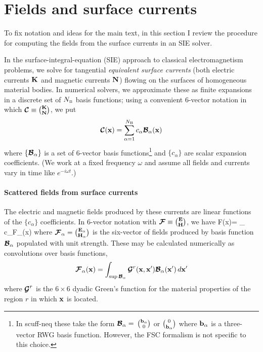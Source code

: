 \newpage
\section{Fields and surface currents}

To fix notation and ideas for the main text, in this section
I review the procedure for computing the fields from the 
surface currents in an SIE solver.

In the surface-integral-equation (SIE) approach to
classical electromagnetism problems, we solve for tangential
\textit{equivalent surface currents} (both electric currents $\mathbf{K}$ 
and magnetic currents $\mathbf{N}$) flowing on the surfaces of 
homogeneous material bodies. In numerical solvers, we 
approximate these as finite expansions in a discrete set
of $N_{\hbox{\tiny{B}}}$ basis functions; using a convenient 6-vector notation 
in which $\boldsymbol{\mathcal{C}}\equiv {\mathbf{K} \choose \mathbf{N}}$, we put
$$ \boldsymbol{\mathcal{C}}(\mathbf{x})=\sum_{\alpha=1}^{N_{\hbox{\tiny{B}}}} 
   c_\alpha \boldsymbol{\mathcal{B}}_\alpha(\mathbf{x}) 
$$ 
where $\{\boldsymbol{\mathcal{B}}_\alpha\}$ is a set of 6-vector basis 
functions\footnote{In {\sc scuff-neq} these take the form
$\boldsymbol{\mathcal{B}}_\alpha=$ 
$\mathbf{b}_\alpha \choose 0$ 
or 
$0 \choose \mathbf{b}_\alpha$
where $\mathbf{b}_\alpha$ is a three-vector RWG basis function.
However, the FSC formalism is not specific to this choice.}
and $\{c_\alpha\}$ are scalar expansion coefficients.
(We work at a fixed frequency $\omega$ and assume all fields
and currents vary in time like $e^{-i\omega t}$.)

\paragraph{Scattered fields from surface currents}

The electric and magnetic fields produced by these currents
are linear functions of the $\{c_\alpha\}$ coefficients.
In 6-vector notation with $\boldsymbol{\mathcal{F}}\equiv {\mathbf{E} \choose \mathbf{H}}$, we have
{ \bmc F(\vb x)=
   \sum_{\alpha} c_\alpha \bmc F_\alpha(\vb x)
}
where $\boldsymbol{\mathcal{F}}_\alpha={\mathbf{E}_\alpha \choose \mathbf{H}_\alpha}$ 
is the six-vector of fields produced by basis function $\boldsymbol{\mathcal{B}}_\alpha$ 
populated with unit strength. These may be calculated numerically
as convolutions over basis functions,
$$ \boldsymbol{\mathcal{F}}_\alpha(\mathbf{x})
   =\int_{\sup \boldsymbol{\mathcal{B}}_\alpha} \boldsymbol{\mathcal{G}}^{r}(\mathbf{x}, \mathbf{x}^\prime)
    \boldsymbol{\mathcal{B}}_\alpha(\mathbf{x}^\prime) \, d\mathbf{x}^\prime
$$
where $\boldsymbol{\mathcal{G}}^{r}$ is the $6\times 6$ dyadic Green's function
for the material properties of the region $r$ in which $\mathbf{x}$ is located.

